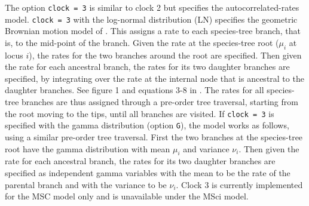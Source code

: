 \documentclass{book}
\numberwithin{equation}{section} \renewcommand{\baselinestretch}{0.55}
\begin{document}
The option \texttt{clock = 3} is similar to clock 2 but specifies the
autocorrelated-rates model. \texttt{clock = 3} with the log-normal
distribution (LN) specifies the geometric Brownian motion model of
\citet{Rannala2007}.  This assigns a rate to each species-tree branch,
that is, to the mid-point of the branch.  Given the rate at the
species-tree root ($\mu_i$ at locus $i$), the rates for the two
branches around the root are specified.  Then given the rate for each
ancestral branch, the rates for its two daughter branches are
specified, by integrating over the rate at the internal node that is
ancestral to the daughter branches. See figure 1 and equations 3-8 in
\citet{Rannala2007}.  The rates for all species-tree branches are thus
assigned through a pre-order tree traversal, starting from the root
moving to the tips, until all branches are visited.  If \texttt{clock
  = 3} is specified with the gamma distribution (option \texttt{G}),
the model works as follows, using a similar pre-order tree traversal.
First the two branches at the species-tree root have the gamma
distribution with mean $\mu_i$ and variance $\nu_i$.  Then given the
rate for each ancestral branch, the rates for its two daughter
branches are specified as independent gamma variables with the mean to
be the rate of the parental branch and with the variance to be
$\nu_i$.  Clock 3 is currently implemented for the MSC model only and
is unavailable under the MSci model.
\end{document}
